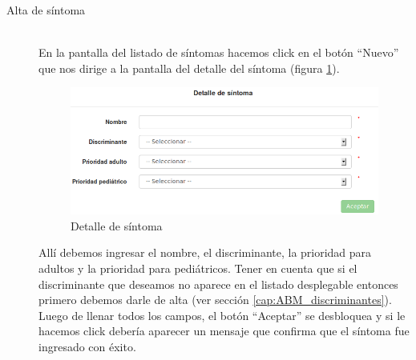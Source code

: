 \begin{description}
\item[Alta de síntoma] \mbox{} \\
En la pantalla del listado de síntomas hacemos click en el botón ``Nuevo'' que nos dirige a la pantalla del detalle del síntoma (figura \ref{fig:detalle_sintoma}).
\begin{figure}
\centerline{\includegraphics[width=1\textwidth]{detalle_sintoma.png}}
\caption{Detalle de síntoma}
\label{fig:detalle_sintoma}
\end{figure}
Allí debemos ingresar el nombre, el discriminante, la prioridad para adultos y la prioridad para pediátricos. Tener en cuenta que si el discriminante que deseamos no aparece en el listado desplegable entonces primero debemos darle de alta (ver sección \ref{cap:ABM_discriminantes}). Luego de llenar todos los campos, el botón ``Aceptar'' se desbloquea y si le hacemos click debería aparecer un mensaje que confirma que el síntoma fue ingresado con éxito.


\end{description}
